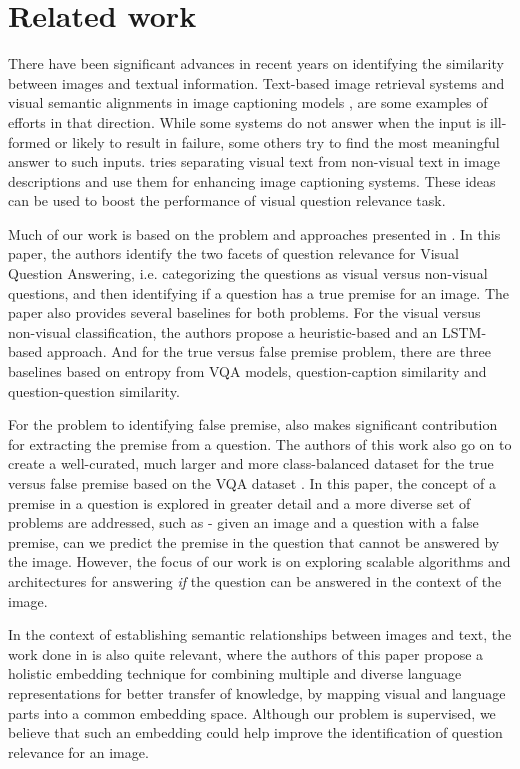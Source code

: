\section{Related work}

There have been significant advances in recent years on identifying the similarity between images and textual information. Text-based image retrieval \cite{liu2009boost} systems and visual semantic alignments in image captioning models \cite{karpathy2015deep}, \cite{fang2015captions} are some examples of efforts in that direction. While some systems do not answer when the input is ill-formed or likely to result in failure, some others try to find the most meaningful answer to such inputs. \cite{dodge2012detecting} tries separating visual text from non-visual text in image descriptions and use them for enhancing image captioning systems. These ideas can be used to boost the performance of visual question relevance task. 

Much of our work is based on the problem and approaches presented in \cite{ray2016question}. In this paper, the authors identify the two facets of question relevance for Visual Question Answering, i.e. categorizing the questions as visual versus non-visual questions, and then identifying if a question has a true premise for an image. The paper also provides several baselines for both  problems. For the visual versus non-visual classification, the authors propose a heuristic-based and an LSTM-based approach. And for the true versus false premise problem, there are three baselines based on entropy from VQA models, question-caption similarity and question-question similarity. 

For the problem to identifying false premise, \cite{mahendru2017promise} also makes significant contribution for extracting the premise from a question. The authors of this work also go on to create a well-curated, much larger and more class-balanced dataset for the true versus false premise based on the VQA dataset \cite{AntolALMBZP15}. In this paper, the concept of a premise in a question is explored in greater detail and a more diverse set of problems are addressed, such as - given an image and a question with a false premise, can we predict the premise in the question that cannot be answered by the image. However, the focus of our work is on exploring scalable algorithms and architectures for answering \textit{if} the question can be answered in the context of the image.

In the context of establishing semantic relationships between images and text, the work done in \cite{AkataMFS16} is also quite relevant, where the authors of this paper propose a holistic embedding technique for combining multiple and diverse language representations for better transfer of knowledge, by mapping visual and language parts into a common embedding space. Although our problem is supervised, we believe that such an embedding could help improve the identification of question relevance for an image.


